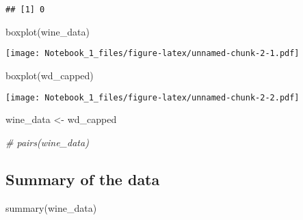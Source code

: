 \documentclass[
]{article}
\newenvironment{Shaded}{\begin{snugshade}}{\end{snugshade}}
\newcommand{\CommentTok}[1]{\textcolor[rgb]{0.56,0.35,0.01}{\textit{#1}}}
\newcommand{\FunctionTok}[1]{\textcolor[rgb]{0.00,0.00,0.00}{#1}}
\newcommand{\NormalTok}[1]{#1}
\newcommand{\OtherTok}[1]{\textcolor[rgb]{0.56,0.35,0.01}{#1}}
\begin{document}
\begin{verbatim}
## [1] 0
\end{verbatim}

\begin{Shaded}
\begin{Highlighting}[]
\FunctionTok{boxplot}\NormalTok{(wine\_data)}
\end{Highlighting}
\end{Shaded}

\texttt{[image: Notebook\_1\_files/figure-latex/unnamed-chunk-2-1.pdf]}

\begin{Shaded}
\begin{Highlighting}[]
\FunctionTok{boxplot}\NormalTok{(wd\_capped)}
\end{Highlighting}
\end{Shaded}

\texttt{[image: Notebook\_1\_files/figure-latex/unnamed-chunk-2-2.pdf]}

\begin{Shaded}
\begin{Highlighting}[]
\NormalTok{wine\_data }\OtherTok{\textless{}{-}}\NormalTok{ wd\_capped}
\end{Highlighting}
\end{Shaded}

\begin{Shaded}
\begin{Highlighting}[]
\CommentTok{\# pairs(wine\_data)}
\end{Highlighting}
\end{Shaded}

\hypertarget{summary-of-the-data}{%
\subsection{Summary of the data}\label{summary-of-the-data}}

\begin{Shaded}
\begin{Highlighting}[]
\FunctionTok{summary}\NormalTok{(wine\_data)}
\end{Highlighting}
\end{Shaded}
\end{document}
